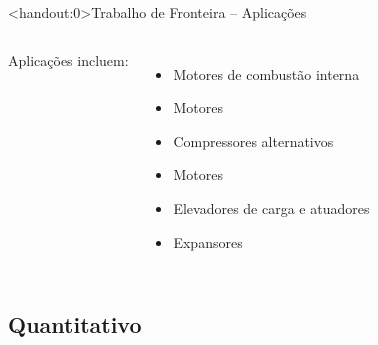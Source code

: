     \begin{frame}<handout:0>{Trabalho de Fronteira -- Aplicações}\vspace*{-2em}
        \begin{columns}
        Aplicações incluem:                                             \\[\medskipamount]
        \begin{itemize}
            \item Motores de combustão interna                          \\[\medskipamount]
            \item Motores \bf{}\rm     \\[\medskipamount]
            \item Compressores alternativos                             \\[\medskipamount]
            \item Motores \bf{}\rm     \\[\medskipamount]
            \item Elevadores de carga e atuadores                       \\[\medskipamount]
            \item Expansores \bf{}\rm
        \end{itemize}
        \end{columns}
    \end{frame}

\subsection{Quantitativo}

